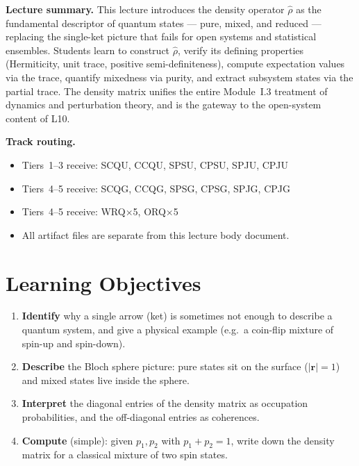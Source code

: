 \documentclass[11pt,a4paper]{article}
\begin{document}
\medskip
\begin{tcolorbox}[notebox]
\textbf{Lecture summary.}
This lecture introduces the density operator $\hat{\rho}$ as the fundamental
descriptor of quantum states --- pure, mixed, and reduced --- replacing the
single-ket picture that fails for open systems and statistical ensembles.
Students learn to construct $\hat{\rho}$, verify its defining properties
(Hermiticity, unit trace, positive semi-definiteness), compute expectation
values via the trace, quantify mixedness via purity, and extract subsystem
states via the partial trace.
The density matrix unifies the entire Module~I.3 treatment of dynamics and
perturbation theory, and is the gateway to the open-system content of L10.
\end{tcolorbox}

\medskip
\begin{tcolorbox}[goldbox]
\textbf{Track routing.}
\begin{itemize}[leftmargin=1.5em,itemsep=2pt]
  \item {} Tiers~1--3 receive: SCQU, CCQU, SPSU, CPSU, SPJU, CPJU
  \item {} Tiers~4--5 receive: SCQG, CCQG, SPSG, CPSG, SPJG, CPJG
  \item {} Tiers~4--5 receive: WRQ$\times$5, ORQ$\times$5
  \item All artifact files are separate from this lecture body document.
\end{itemize}
\end{tcolorbox}

\newpage
\section{Learning Objectives}
\label{sec:L01.1}

\begin{tcolorbox}[ugconceptbox,title={Tier 1 (HS) --- By the end of this lecture, you should be able to\ldots}]
\begin{enumerate}[leftmargin=1.8em,itemsep=3pt]
  \item \textbf{Identify} why a single arrow (ket) is sometimes not enough to
        describe a quantum system, and give a physical example (e.g.\ a coin-flip
        mixture of spin-up and spin-down).
  \item \textbf{Describe} the Bloch sphere picture: pure states sit on the surface
        ($|\mathbf{r}|=1$) and mixed states live inside the sphere.
  \item \textbf{Interpret} the diagonal entries of the density matrix as
        occupation probabilities, and the off-diagonal entries as coherences.
  \item \textbf{Compute} (simple): given $p_1,p_2$ with $p_1+p_2=1$, write down
        the density matrix for a classical mixture of two spin states.
\end{enumerate}
\end{tcolorbox}
\end{document}
